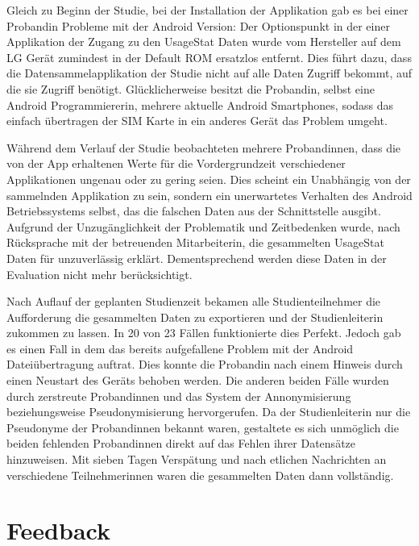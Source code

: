 Gleich zu Beginn der Studie, bei der Installation der Applikation gab es bei einer Probandin Probleme mit der Android Version:
Der Optionspunkt in der einer Applikation der Zugang zu den UsageStat Daten wurde vom Hersteller auf dem LG Gerät zumindest in der Default ROM ersatzlos entfernt.
Dies führt dazu, dass die Datensammelapplikation der Studie nicht auf alle Daten Zugriff bekommt, auf die sie Zugriff benötigt.
Glücklicherweise besitzt die Probandin, selbst eine Android Programmiererin, mehrere aktuelle Android Smartphones, sodass das einfach übertragen der SIM Karte in ein anderes Gerät das Problem umgeht.
\par
Während dem Verlauf der Studie beobachteten mehrere Probandinnen,  dass die von der App erhaltenen Werte für die Vordergrundzeit verschiedener Applikationen ungenau oder zu gering seien.
Dies scheint ein Unabhängig von der sammelnden Applikation zu sein, sondern ein unerwartetes Verhalten des Android Betriebssystems selbst, das die falschen Daten aus der Schnittstelle ausgibt.
Aufgrund der Unzugänglichkeit der Problematik und Zeitbedenken wurde, nach Rücksprache mit der betreuenden Mitarbeiterin, die gesammelten UsageStat Daten für unzuverlässig erklärt.
Dementsprechend werden diese Daten in der Evaluation nicht mehr berücksichtigt.
\par
Nach Auflauf der geplanten Studienzeit bekamen alle Studienteilnehmer die Aufforderung die gesammelten Daten zu exportieren und der Studienleiterin zukommen zu lassen. 
In 20 von 23 Fällen funktionierte dies Perfekt.
Jedoch gab es einen Fall in dem das bereits aufgefallene Problem \cite{androidbug} mit der Android Dateiübertragung auftrat.
Dies konnte die Probandin nach einem Hinweis durch einen Neustart des Geräts behoben werden.
Die anderen beiden Fälle wurden durch zerstreute Probandinnen und das System der Annonymisierung beziehungsweise Pseudonymisierung hervorgerufen.
Da der Studienleiterin nur die Pseudonyme der Probandinnen bekannt waren, gestaltete es sich unmöglich die beiden fehlenden Probandinnen direkt auf das Fehlen ihrer Datensätze hinzuweisen.
Mit sieben Tagen Verspätung und nach etlichen Nachrichten an verschiedene Teilnehmerinnen waren die gesammelten Daten dann vollständig.

\section{Feedback}

